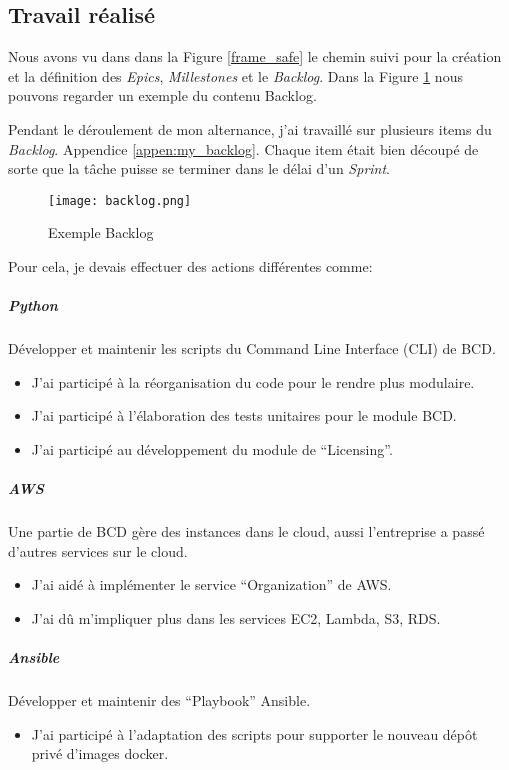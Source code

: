 \subsection{Travail réalisé}\label{sec:work_done}
Nous avons vu dans dans la Figure \ref{frame_safe} le chemin suivi pour la création et la définition des \textit{Epics}, \textit{Millestones} et le \textit{Backlog}. Dans la Figure \ref{fig:backlog} nous pouvons regarder un exemple du contenu Backlog.

Pendant le déroulement de mon alternance, j'ai travaillé sur plusieurs items du \textit{Backlog}. Appendice  \ref{appen:my_backlog}. Chaque item était bien découpé de sorte que la tâche puisse se terminer dans le délai d'un \textit{Sprint}.

\begin{figure}[!ht]
\centering
\texttt{[image: backlog.png]}
\caption{Exemple Backlog}
\label{fig:backlog}
\end{figure}

Pour cela, je devais effectuer des actions différentes comme:

\subparagraph{Python} Développer et maintenir les scripts du Command Line Interface (CLI) de BCD.
\begin{itemize}
  \item J'ai participé à la réorganisation du code pour le rendre plus modulaire.
  \item J'ai participé à l'élaboration des tests unitaires pour le module BCD.
  \item J'ai participé au développement du module de \enquote{Licensing}.
\end{itemize}

\subparagraph{AWS} Une partie de BCD gère des instances dans le cloud, aussi l'entreprise a passé d'autres services sur le cloud.
\begin{itemize}
  \item J'ai aidé à implémenter le service \enquote{Organization} de AWS.
  \item J'ai dû m'impliquer plus dans les services EC2, Lambda, S3, RDS.
\end{itemize}

\subparagraph{Ansible} Développer et maintenir des \enquote{Playbook} Ansible.
\begin{itemize}
  \item J'ai participé à l'adaptation des scripts pour supporter le nouveau dépôt privé d'images docker.
\end{itemize}


